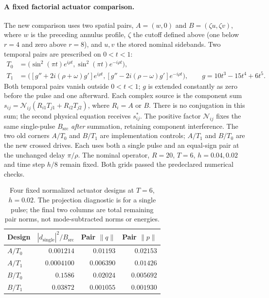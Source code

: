 \paragraph{A fixed factorial actuator comparison.}
The new comparison uses two spatial pairs, $A=(w,0)$ and
$B=(\zeta u,\zeta v)$, where $w$ is the preceding annulus profile,
$\zeta$ the cutoff defined above (one below $r=4$ and zero above $r=8$),
and $u,v$ the stored nominal sidebands.
Two temporal pairs are prescribed on $0<t<1$:
\begin{align}
 T_0&=\bigl(\sin^2(\pi t)e^{i\rho t},
                  \sin^2(\pi t)e^{-i\rho t}\bigr),\\
 T_1&=\bigl([g''+2i(\rho+\omega)g']e^{i\rho t},
                  [g''-2i(\rho-\omega)g']e^{-i\rho t}\bigr),
 \qquad g=10t^3-15t^4+6t^5.
\end{align}
Both temporal pairs vanish outside $0<t<1$; $g$ is extended constantly
as zero before the pulse and one afterward.
Each complex source is the component sum
$s_{ij}=\mathcal N_{ij}(R_{i1}T_{j1}+R_{i2}T_{j2})$,
where $R_i=A$ or $B$. There is no conjugation in this sum; the second
physical equation receives $s_{ij}^*$.
The positive factor $\mathcal N_{ij}$ fixes the same single-pulse
$B_{\mathrm{src}}$ \emph{after} summation, retaining component interference.
The two old corners $A/T_0$ and $B/T_1$ are implementation controls;
$A/T_1$ and $B/T_0$ are the new crossed drives. Each uses both a single
pulse and an equal-sign pair at the unchanged delay $\pi/\rho$.
The nominal operator, $R=20$, $T=6$, $h=0.04,0.02$ and time step $h/8$
remain fixed. Both grids passed the predeclared numerical checks.

\begin{table}[htbp]\centering\small
\caption{Four fixed normalized actuator designs at $T=6$, $h=0.02$.
The projection diagnostic is for a single pulse; the final two columns
are total remaining pair norms, not mode-subtracted norms or energies.}
\label{tab:source-factorial}
\begin{tabular}{lrrr}\toprule
Design&$|d_{\mathrm{single}}|^2/B_{\mathrm{src}}$&Pair $\|q\|$&Pair $\|p\|$\\\midrule
$A/T_0$&$0.001214$&$0.01193$&$0.02153$\\
$A/T_1$&$0.0004100$&$0.006390$&$0.01426$\\
$B/T_0$&$0.1586$&$0.02024$&$0.005692$\\
$B/T_1$&$0.03872$&$0.001055$&$0.001930$\\\bottomrule
\end{tabular}
\end{table}

